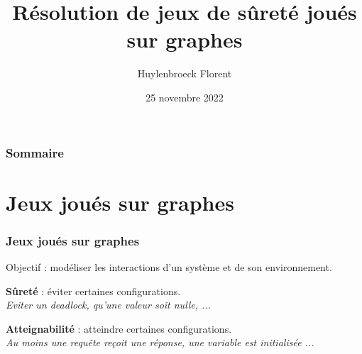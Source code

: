 \documentclass{beamer}
\title{Résolution de jeux de sûreté joués sur graphes}
\author{Huylenbroeck Florent}
\institute{UMONS}
\date{25 novembre 2022}
\begin{document}
\frame{\titlepage}

\begin{frame}
\frametitle{Sommaire}
\tableofcontents
\end{frame}

\section{Jeux joués sur graphes}
\begin{frame}
\frametitle{Jeux joués sur graphes}
Objectif : modéliser les interactions d'un système et de son environnement.\\[3mm]

\noindent
\begin{minipage}[t]{.45\textwidth}
\textbf{Sûreté} : éviter certaines configurations.\\
\emph{Eviter un deadlock, qu'une valeur soit nulle, ...}
\end{minipage}
\hfill\vline\hfill
\begin{minipage}[t]{.45\textwidth}
\textbf{Atteignabilité} : atteindre certaines configurations.\\
\emph{Au moins une requête reçoit une réponse, une variable est initialisée ...}
\end{minipage}\\[2mm]
\end{frame}
\end{document}

